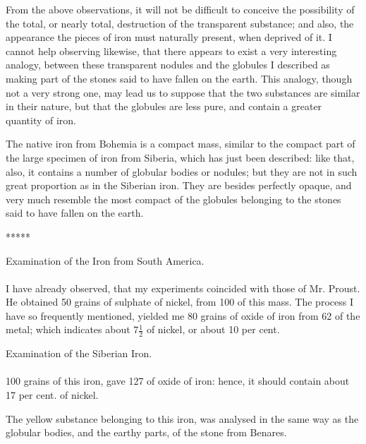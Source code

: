 \documentclass[a4paper, 12pt, oneside]{article}
\begin{document}
From the above observations, it will not be difficult to conceive the possibility of the total, or nearly total, destruction of the transparent substance; and also, the appearance the pieces of iron must naturally present, when deprived of it. I cannot help observing likewise, that there appears to exist a very interesting analogy, between these transparent nodules and the globules I described as making part of the stones said to have fallen on the earth. This analogy, though not a very strong one, may lead us to suppose that the two substances are similar in their nature, but that the globules are less pure, and contain a greater quantity of iron.

The native iron from Bohemia is a compact mass, similar to the compact part of the large specimen of iron from Siberia, which has just been described: like that, also, it contains a number of globular bodies or nodules; but they are not in such great proportion as in the Siberian iron. They are besides perfectly opaque, and very much resemble the most compact of the globules belonging to the stones said to have fallen on the earth.

\centerline{*\hspace{15mm}*\hspace{15mm}*\hspace{15mm}*\hspace{15mm}*}
\bigskip

\begin{center}
Examination of the Iron from South America.
\end{center}
\paragraph{}
I have already observed, that my experiments coincided with those of Mr. Proust. He obtained 50 grains of sulphate of nickel, from 100 of this mass. The process I have so frequently mentioned, yielded me 80 grains of oxide of iron from 62 of the metal; which indicates about $7\frac{1}{2}$ of nickel, or about 10 per cent.
\begin{center}
Examination of the Siberian Iron.
\end{center}
\paragraph{}
100 grains of this iron, gave 127 of oxide of iron: hence, it should contain about 17 per cent. of nickel.

The yellow substance belonging to this iron, was analysed in the same way as the globular bodies, and the earthy parts, of the stone from Benares.
\end{document}
